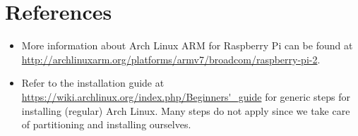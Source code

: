 \documentclass{article}
\begin{document}
\section{References}
\begin{itemize}
    \item More information about Arch Linux ARM for Raspberry Pi can be found 
          at \\
          \url{http://archlinuxarm.org/platforms/armv7/broadcom/raspberry-pi-2}.
    \item Refer to the installation guide at 
          \url{https://wiki.archlinux.org/index.php/Beginners'_guide} for 
          generic steps for installing (regular) Arch Linux. Many steps do not 
          apply since we take care of partitioning and installing ourselves.
\end{itemize}
\end{document}
